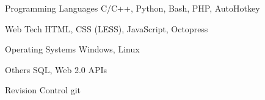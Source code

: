 \cventry{}
    {Programming Languages}
    {}
    {C/C++, Python, Bash, PHP, AutoHotkey}
    {}
    {}

\cventry{}
    {Web Tech}
    {}
    {HTML, CSS (LESS), JavaScript, Octopress}
    {}
    {}

\cventry{}
    {Operating Systems}
    {}
    {Windows, Linux}
    {}
    {}

\cventry{}
    {Others}
    {}
    {SQL, Web 2.0 APIs}
    {}
    {}

\cventry{}
    {Revision Control}
    {}
    {git}
    {}
    {}


